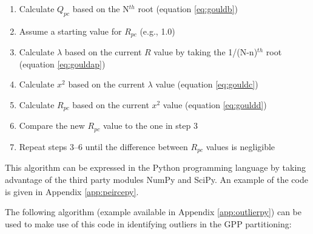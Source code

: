 \begin{enumerate}
    \item Calculate $Q_{pc}$ based on the N$^{th}$ root (equation \ref{eq:gouldb})
    \item Assume a starting value for $R_{pc}$ (e.g., 1.0)
    \item Calculate $\lambda$ based on the current $R$ value by taking the 
          1/(N-n)$^{th}$ root (equation \ref{eq:gouldap})
    \item Calculate $x^{2}$ based on the current $\lambda$ value (equation
          \ref{eq:gouldc})
    \item Calculate $R_{pc}$ based on the current $x^{2}$ value (equation 
          \ref{eq:gouldd})
    \item Compare the new $R_{pc}$ value to the one in step 3
    \item Repeat steps 3--6 until the difference between $R_{pc}$ values is 
          negligible 
\end{enumerate}

\noindent This algorithm can be expressed in the Python programming language by taking advantage of the third party modules NumPy\footnotemark {} and SciPy\footnotemark.  
An example of the code is given in Appendix \ref{app:peircepy}.

The following algorithm (example available in Appendix \ref{app:outlierpy}) can be used to make use of this code in identifying outliers in the GPP partitioning: 

